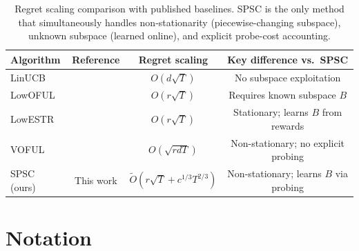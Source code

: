 \documentclass{article}
\begin{document}
\begin{table}[!htpb]
\caption{Regret scaling comparison with published baselines.
SPSC is the only method that simultaneously handles non-stationarity (piecewise-changing subspace),
unknown subspace (learned online), and explicit probe-cost accounting.}
\centering
\small
\begin{tabular}{lccc}
\toprule
Algorithm & Reference & Regret scaling & Key difference vs.\ SPSC \\
\midrule
LinUCB          & \cite{li2010contextual}       & $O(d\sqrt{T})$        & No subspace exploitation \\
LowOFUL         & \cite{jun2019bilinear}        & $O(r\sqrt{T})$        & Requires known subspace $B$ \\
LowESTR         & \cite{lu2021lowrank}              & $O(r\sqrt{T})$        & Stationary; learns $B$ from rewards \\
VOFUL           & \cite{cesabianchi2023colt}     & $O(\sqrt{rdT})$       & Non-stationary; no explicit probing \\
\midrule
 SPSC (ours) & This work & $\widetilde O(r\sqrt{T} + c^{1/3}T^{2/3})$ & Non-stationary; learns $B$ via probing \\
\bottomrule
\end{tabular}

\label{tab:published_comparison}
\end{table}

\section{Notation}
\label{app:notation}

\footnotesize
\setlength{\tabcolsep}{4pt}
\renewcommand{\arraystretch}{1.3}
\end{document}

